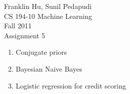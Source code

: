 \documentclass{article}
\begin{document}
Franklin Hu, Sunil Pedapudi \\
CS 194-10 Machine Learning \\
Fall 2011 \\
Assignment 5 \\

\begin{enumerate}
    \item Conjugate priors %
    \item Bayesian Naive Bayes %
    \item Logistic regression for credit scoring %
\end{enumerate}
\end{document}
